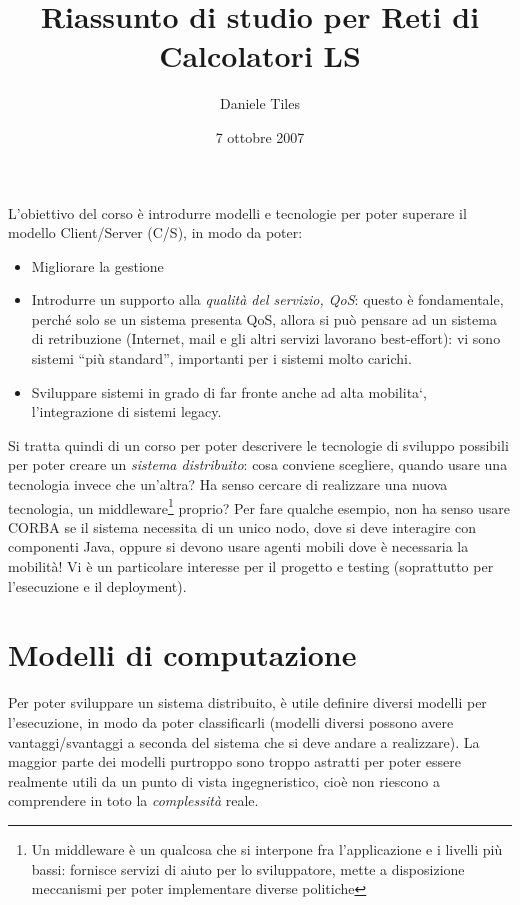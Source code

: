\documentclass[a4paper,12pt]{article}
\title{Riassunto di studio per Reti di Calcolatori LS}
\author{Daniele Tiles}
\date{7 ottobre 2007}
\begin{document}
\maketitle
\newpage
\tableofcontents
\newpage
L'obiettivo del corso è introdurre modelli e tecnologie per poter superare il modello Client/Server (C/S), in modo 
da poter:
\begin{itemize}
 \item Migliorare la gestione
 \item Introdurre un supporto alla \textit{qualità del servizio, QoS}: questo è fondamentale, perché solo se un sistema
 presenta QoS, allora si può pensare ad un sistema di retribuzione (Internet, mail e gli altri servizi
lavorano best-effort): vi sono sistemi ``più standard'', importanti per i sistemi molto carichi.
\item Sviluppare sistemi in grado di far fronte anche ad alta mobilita`, l'integrazione di sistemi legacy.
\end{itemize}
Si tratta quindi di un corso per poter descrivere le tecnologie di sviluppo possibili per poter creare un
\textit{sistema distribuito}: cosa conviene scegliere, quando usare una tecnologia invece che un'altra? Ha senso cercare
di realizzare una nuova tecnologia, un middleware\footnote{Un middleware è un qualcosa che si interpone fra
l'applicazione e i livelli più bassi: fornisce servizi di aiuto per lo sviluppatore, mette a disposizione meccanismi per
poter implementare diverse politiche} proprio? Per fare qualche esempio, non ha senso usare CORBA
se il sistema necessita di un unico nodo, dove si deve interagire con componenti Java, oppure si devono usare agenti
mobili dove è necessaria la mobilità! Vi è un particolare interesse per il progetto e testing (soprattutto per
l'esecuzione e il deployment).

\section{Modelli di computazione}
Per poter sviluppare un sistema distribuito, è utile definire diversi modelli per l'esecuzione, in modo da poter
classificarli (modelli diversi possono avere vantaggi/svantaggi a seconda del sistema che si deve andare a realizzare).
La maggior parte dei modelli purtroppo sono troppo astratti per poter essere realmente utili da un punto di vista
ingegneristico, cioè non riescono a comprendere in toto la \textit{complessità} reale.
\newline
\end{document}
